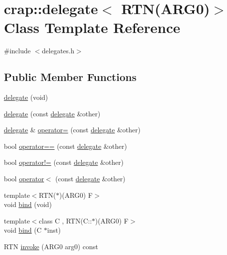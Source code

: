 \hypertarget{classcrap_1_1delegate_3_01_r_t_n_07_a_r_g0_08_4}{\section{crap\+:\+:delegate$<$ R\+T\+N(A\+R\+G0)$>$ Class Template Reference}
\label{classcrap_1_1delegate_3_01_r_t_n_07_a_r_g0_08_4}
}


{\ttfamily \#include $<$delegates.\+h$>$}

\subsection*{Public Member Functions}
\begin{DoxyCompactItemize}
\item 
\hyperlink{classcrap_1_1delegate_3_01_r_t_n_07_a_r_g0_08_4_ad3e8ec6a20b2a4149c5f8a75834c47e7}{delegate} (void)
\item 
\hyperlink{classcrap_1_1delegate_3_01_r_t_n_07_a_r_g0_08_4_aafb1633be45285d6e4e656ecd6488a23}{delegate} (const \hyperlink{classcrap_1_1delegate}{delegate} \&other)
\item 
\hyperlink{classcrap_1_1delegate}{delegate} \& \hyperlink{classcrap_1_1delegate_3_01_r_t_n_07_a_r_g0_08_4_a2720d3057c774df322d57d2ad457cad8}{operator=} (const \hyperlink{classcrap_1_1delegate}{delegate} \&other)
\item 
bool \hyperlink{classcrap_1_1delegate_3_01_r_t_n_07_a_r_g0_08_4_ac9f462e91e9ba0f9320e8e86f83f67b1}{operator==} (const \hyperlink{classcrap_1_1delegate}{delegate} \&other)
\item 
bool \hyperlink{classcrap_1_1delegate_3_01_r_t_n_07_a_r_g0_08_4_ae6e89c02583ad326428e8ea8807e3749}{operator!=} (const \hyperlink{classcrap_1_1delegate}{delegate} \&other)
\item 
bool \hyperlink{classcrap_1_1delegate_3_01_r_t_n_07_a_r_g0_08_4_abb0752f800a91dcdb388f693580a0c58}{operator$<$} (const \hyperlink{classcrap_1_1delegate}{delegate} \&other)
\item 
{\footnotesize template$<$R\+T\+N($\ast$)(\+A\+R\+G0) F$>$ }\\void \hyperlink{classcrap_1_1delegate_3_01_r_t_n_07_a_r_g0_08_4_a2f67a292d2724475d8c321b81ab00b01}{bind} (void)
\item 
{\footnotesize template$<$class C , R\+T\+N(\+C\+::$\ast$)(\+A\+R\+G0) F$>$ }\\void \hyperlink{classcrap_1_1delegate_3_01_r_t_n_07_a_r_g0_08_4_ad765fdfdf999e6d543e9361b1d534e8f}{bind} (C $\ast$inst)
\item 
R\+T\+N \hyperlink{classcrap_1_1delegate_3_01_r_t_n_07_a_r_g0_08_4_a0732d5ea7504ad9427bdde563fa2b1ea}{invoke} (A\+R\+G0 arg0) const 
\end{DoxyCompactItemize}


